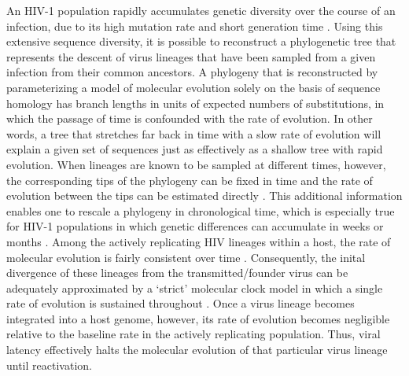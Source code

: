 \documentclass[12pt]{article}
\begin{document}
An HIV-1 population rapidly accumulates genetic diversity over the course of an infection, due to its high mutation rate and short generation time %
\citep{Alizon13, Shankarappa99, Rambaut04}. 
Using this extensive sequence diversity, it is possible to reconstruct a phylogenetic tree that represents the descent of virus lineages that have been sampled from a given infection from their common ancestors. 
A phylogeny that is reconstructed by parameterizing a model of molecular evolution \cite[\textit{e.g.}, by maximum likelihood estimation;][]{Felsenstein:1981} solely on the basis of sequence homology has branch lengths in units of expected numbers of substitutions, in which the passage of time is confounded with the rate of evolution.
In other words, a tree that stretches far back in time with a slow rate of evolution will explain a given set of sequences just as effectively as a shallow tree with rapid evolution.  
When lineages are known to be sampled at different times, however, the corresponding tips of the phylogeny can be fixed in time and the rate of evolution between the tips can be estimated directly \citep{Rodrigo99}.
This additional information enables one to rescale a phylogeny in chronological time, which is especially true for HIV-1 populations in which genetic differences can accumulate in weeks or months \citep{Williamson:2003}.
Among the actively replicating HIV lineages within a host, the rate of molecular evolution is fairly consistent over time \citep{Leitner99, Kuhner95, Korber00}.
Consequently, the inital divergence of these lineages from the transmitted/founder virus can be adequately approximated by a `strict' molecular clock model in which a single rate of evolution is sustained throughout \citep{Keele08}.
Once a virus lineage becomes integrated into a host genome, however, its rate of evolution becomes negligible relative to the baseline rate in the actively replicating population.
Thus, viral latency effectively halts the molecular evolution of that particular virus lineage until reactivation. 
\end{document}
